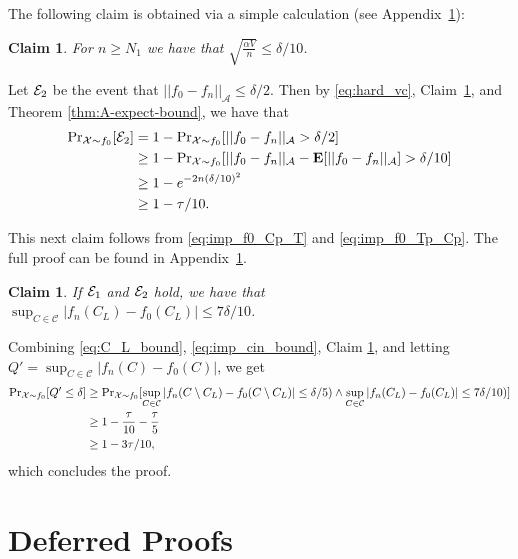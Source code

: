 \documentclass[final,12pt]{colt2018}
\newcommand{\nnew}[1]{{\color{red} #1}}
\newcommand{\nnew}[1]{#1}
\newtheorem{informal theorem}[theorem]{Theorem (informal statement)}
\newtheorem{claim}[theorem]{Claim}
\newcommand{\E}{\mathbf{E}}
\begin{document}
The following claim is obtained via a simple calculation (see Appendix~\ref{sec:main-appendix}):

\begin{claim}\label{claim:hard_vc}
 {For $n \geq N_1$ we have that $\sqrt{\frac{ {\alpha V}}{n}} \leq \delta / 10$.}
\end{claim}


\nnew{
Let ${\cal E}_2$ be the event that $|| f_0 - f_n ||_{\mathcal{A}} \leq \delta / 2$. 
 {Then by \eqref{eq:hard_vc}, Claim~\ref{claim:hard_vc}, and Theorem \ref{thm:A-expect-bound}, we have that}
\begin{align}
{\Pr}_{\mathcal{X}\sim f_0}[{\cal E}_2] &= 1 - {\Pr}_{\mathcal{X}\sim f_0}[|| f_0 - f_n ||_{\mathcal{A}} > \delta / 2] \notag \\
&\geq 1 - {\Pr}_{\mathcal{X}\sim f_0}[|| f_0 - f_n ||_{\mathcal{A}} - \E[|| f_0 - f_n ||_{\mathcal{A}}] > \delta / 10] \notag \\
&\geq 1 - e^{-2n(\delta/10)^2} 
\notag \\
&\geq 1 - \tau/10. \label{eq:imp_cin_bound}
\end{align}
}

\nnew{This next claim follows from \eqref{eq:imp_f0_Cp_T} and \eqref{eq:imp_f0_Tp_Cp}}.
The full proof can be found in Appendix~\ref{sec:main-appendix}.
\nnew{
\begin{claim}\label{claim:hard_vc_cl}
 {If ${\cal E}_1$ and ${\cal E}_2$ hold, we have that $\sup_{C \in \mathcal{C}}|f_n(C_L)-f_0(C_L)| \leq 7\delta/10$}.
\end{claim}
}


\nnew{
Combining \eqref{eq:C_L_bound}, \eqref{eq:imp_cin_bound}, {Claim \ref{claim:hard_vc_cl}}, and letting 
$Q' = \sup_{C \in \mathcal{C}} |f_n(C)-f_0(C)|$, we get
\begin{align}
{\Pr}_{\mathcal{X}\sim f_0}[ Q' \leq \delta] 
&\geq {\Pr}_{\mathcal{X}\sim f_0}[ \sup_{C \in \mathcal{C}} |f_n(C\setminus C_L)-f_0(C\setminus C_L)| \leq \delta/5) \wedge  \sup_{C \in \mathcal{C}} |f_n(C_L)-f_0(C_L)| \leq 7\delta/10)] \notag\\
&\geq 1-\frac{\tau}{10}- \frac{\tau}{5} \notag\\
&\geq 1-3\tau/10 \notag,
\end{align}
}
which concludes the proof.




\section{Deferred Proofs}\label{sec:main-appendix}
\end{document}
